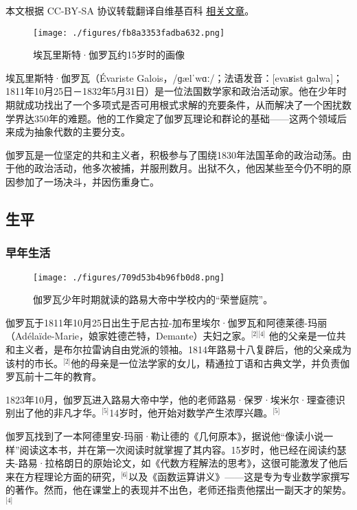 
本文根据 CC-BY-SA 协议转载翻译自维基百科 \href{https://en.wikipedia.org/wiki/\%C3\%89variste_Galois}{相关文章}。

\begin{figure}[ht]
\centering
\texttt{[image: ./figures/fb8a3353fadba632.png]}
\caption{埃瓦里斯特·伽罗瓦约15岁时的画像} \label{fig_AWLS_7}
\end{figure}
埃瓦里斯特·伽罗瓦（Évariste Galois，/ɡælˈwɑː/；法语发音：[evaʁist ɡalwa]；1811年10月25日－1832年5月31日）是一位法国数学家和政治活动家。他在少年时期就成功找出了一个多项式是否可用根式求解的充要条件，从而解决了一个困扰数学界达350年的难题。他的工作奠定了伽罗瓦理论和群论的基础——这两个领域后来成为抽象代数的主要分支。

伽罗瓦是一位坚定的共和主义者，积极参与了围绕1830年法国革命的政治动荡。由于他的政治活动，他多次被捕，并服刑数月。出狱不久，他因某些至今仍不明的原因参加了一场决斗，并因伤重身亡。
\subsection{生平}
\subsubsection{早年生活}
\begin{figure}[ht]
\centering
\texttt{[image: ./figures/709d53b4b96fb0d8.png]}
\caption{伽罗瓦少年时期就读的路易大帝中学校内的“荣誉庭院”。} \label{fig_AWLS_1}
\end{figure}
伽罗瓦于1811年10月25日出生于尼古拉-加布里埃尔·伽罗瓦和阿德莱德-玛丽（Adélaïde-Marie，娘家姓德芒特，Demante）夫妇之家。\(^\text{[2][4]}\) 他的父亲是一位共和主义者，是布尔拉雷讷自由党派的领袖。1814年路易十八复辟后，他的父亲成为该村的市长。\(^\text{[2]}\)他的母亲是一位法学家的女儿，精通拉丁语和古典文学，并负责伽罗瓦前十二年的教育。

1823年10月，伽罗瓦进入路易大帝中学，他的老师路易·保罗·埃米尔·理查德识别出了他的非凡才华。\(^\text{[5]}\)14岁时，他开始对数学产生浓厚兴趣。\(^\text{[5]}\)

伽罗瓦找到了一本阿德里安-玛丽·勒让德的《几何原本》，据说他“像读小说一样”阅读这本书，并在第一次阅读时就掌握了其内容。15岁时，他已经在阅读约瑟夫-路易·拉格朗日的原始论文，如《代数方程解法的思考》，这很可能激发了他后来在方程理论方面的研究，\(^\text{[6]}\)以及《函数运算讲义》——这是专为专业数学家撰写的著作。然而，他在课堂上的表现并不出色，老师还指责他摆出一副天才的架势。\(^\text{[4]}\)
